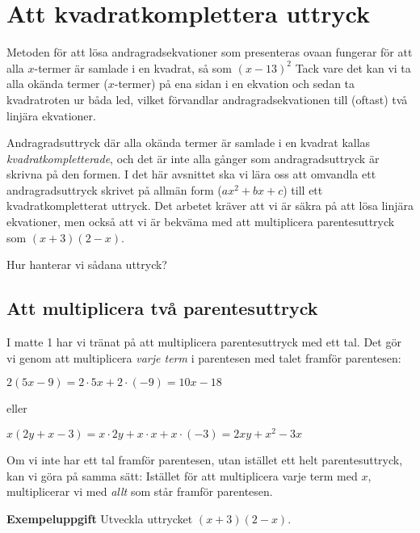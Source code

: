 \section{Att kvadratkomplettera uttryck}

Metoden för att lösa andragradsekvationer som presenteras ovaan fungerar för att alla $x$-termer är samlade i en kvadrat, så som $(x - 13)^2$
Tack vare det kan vi ta alla okända termer ($x$-termer) på ena sidan i en ekvation och sedan ta kvadratroten ur båda led, vilket förvandlar andragradsekvationen till (oftast) två linjära ekvationer.

Andragradsuttryck där alla okända termer är samlade i en kvadrat kallas \emph{kvadratkompletterade}, och det är inte alla gånger som andragradsuttryck är skrivna på den formen.
I det här avsnittet ska vi lära oss att omvandla ett andragradsuttryck skrivet på allmän form ($ax^2 + bx + c$) till ett kvadratkompletterat uttryck.
Det arbetet kräver att vi är säkra på att lösa linjära ekvationer, men också att vi är bekväma med att multiplicera parentesuttryck som $(x+3)(2-x)$.

Hur hanterar vi sådana uttryck?

\subsection{Att multiplicera två parentesuttryck}

I matte 1 har vi tränat på att multiplicera parentesuttryck med ett tal.
Det gör vi genom att multiplicera \emph{varje term} i parentesen med talet framför parentesen:

\begin{center}
$2(5x-9) = 2 \cdot 5x + 2 \cdot (-9) = 10x - 18$
\end{center}

eller

\begin{center}
$x(2y+x-3) = x \cdot 2y + x \cdot x + x \cdot (-3) = 2xy + x^2 - 3x$
\end{center}

Om vi inte har ett tal framför parentesen, utan istället ett helt parentesuttryck, kan vi göra på samma sätt:
Istället för att multiplicera varje term med $x$, multiplicerar vi med \emph{allt} som står framför parentesen.

\textbf{Exempeluppgift}
Utveckla uttrycket $(x+3)(2-x)$.

